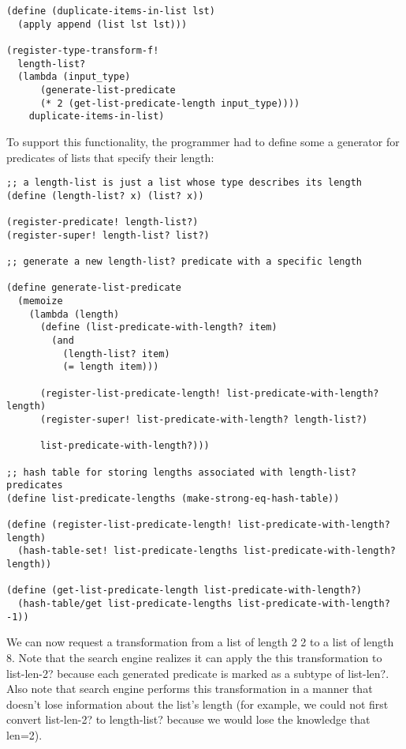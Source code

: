 \documentclass[letterpaper]{article}
\begin{document}
\begin{verbatim}
(define (duplicate-items-in-list lst)
  (apply append (list lst lst)))
  
(register-type-transform-f!
  length-list?
  (lambda (input_type) 
	  (generate-list-predicate
      (* 2 (get-list-predicate-length input_type))))
	duplicate-items-in-list)
\end{verbatim}

To support this functionality, the programmer had to define some a generator for predicates of lists that specify their length:

\begin{verbatim}
;; a length-list is just a list whose type describes its length
(define (length-list? x) (list? x))

(register-predicate! length-list?)
(register-super! length-list? list?)

;; generate a new length-list? predicate with a specific length

(define generate-list-predicate
  (memoize
    (lambda (length)
      (define (list-predicate-with-length? item)
        (and 
          (length-list? item)
          (= length item)))

      (register-list-predicate-length! list-predicate-with-length? length)
      (register-super! list-predicate-with-length? length-list?)
      
      list-predicate-with-length?)))

;; hash table for storing lengths associated with length-list? predicates
(define list-predicate-lengths (make-strong-eq-hash-table)) 

(define (register-list-predicate-length! list-predicate-with-length? length)
  (hash-table-set! list-predicate-lengths list-predicate-with-length? length))

(define (get-list-predicate-length list-predicate-with-length?)
  (hash-table/get list-predicate-lengths list-predicate-with-length? -1))
\end{verbatim}

We can now request a transformation from a list of length 2 2 to a list of length 8. Note that the search engine realizes it can apply the this transformation to list-len-2? because each generated predicate is marked as a subtype of list-len?. Also note that search engine performs this transformation in a manner that doesn't lose information about the list's length (for example, we could not first convert list-len-2? to length-list? because we would lose the knowledge that len=2).
\end{document}
